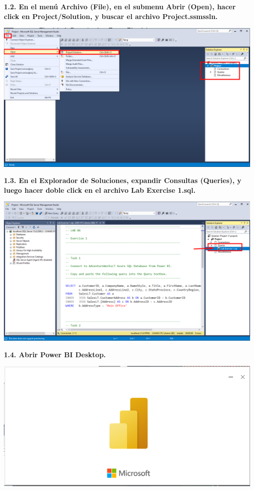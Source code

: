 \documentclass{article}
\begin{document}
\textbf{1.2. En el menú Archivo \textbf{(File)}, en el submenu Abrir \textbf{(Open)}, hacer 
click en \textbf{Project/Solution}, y buscar el archivo \textbf{Project.ssmssln}.}

    \begin{center}
		\includegraphics[width=14cm]{./images/2} 
	\end{center}

\textbf{1.3. En el Explorador de Soluciones, expandir Consultas \textbf{(Queries)}, y luego 
hacer doble click en el archivo \textbf{Lab Exercise 1.sql}.}

    \begin{center}
		\includegraphics[width=14cm]{./images/3} 
	\end{center}

\textbf{1.4. Abrir \textbf{Power BI Desktop}.}

    \begin{center}
		\includegraphics[width=14cm]{./images/4} 
	\end{center}
	
\end{document}
